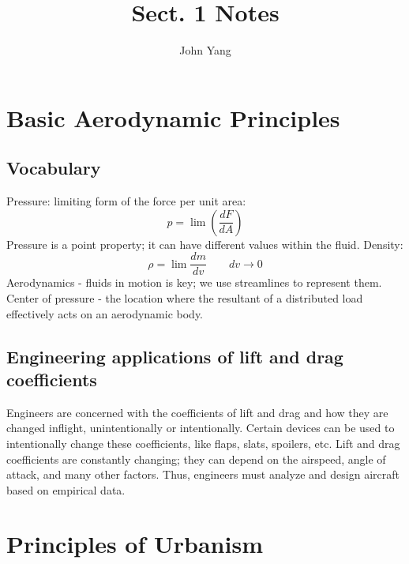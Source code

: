 \documentclass{article}
\title{Sect. 1 Notes} %
\author{John Yang}
\begin{document}
    \maketitle
    \tableofcontents
    \section{Basic Aerodynamic Principles}
    \subsection{Vocabulary}
    \begin{outline}
        \1 Pressure: limiting form of the force per unit area: \[p=\lim\left(\dfrac{dF}{dA}\right)\]
            \2 Pressure is a point property; it can have different values within the fluid. 
        \1 Density: \[\rho=\lim\dfrac{dm}{dv}\qquad dv\to0\]
        \1 Aerodynamics - fluids in motion is key; we use streamlines to represent them. 
        \1 Center of pressure - the location where the resultant of a distributed load effectively acts on an aerodynamic body. 

    \end{outline}
    \subsection{Engineering applications of lift and drag coefficients}
    \begin{outline}
        \1 Engineers are concerned with the coefficients of lift and drag and how they are changed inflight, unintentionally or intentionally. 
        \1 Certain devices can be used to intentionally change these coefficients, like flaps, slats, spoilers, etc. 
        \1 Lift and drag coefficients are constantly changing; they can depend on the airspeed, angle of attack, and many other factors. Thus, engineers must analyze and design aircraft based on empirical data. 

    \end{outline}
    \section{Principles of Urbanism}
    
\end{document}
